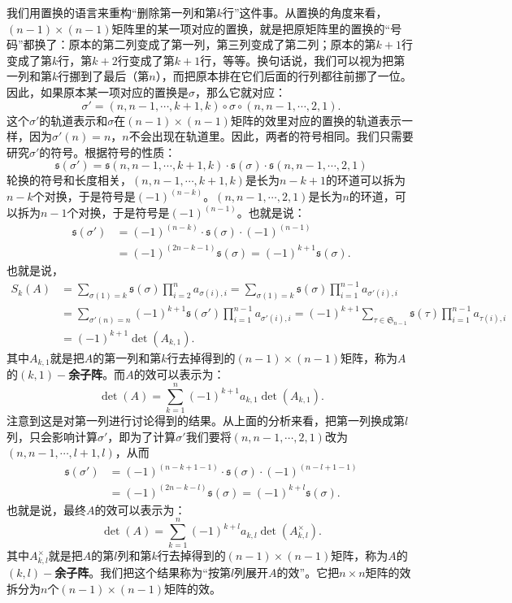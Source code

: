 \documentclass[12pt,UTF8]{ctexbook}
\begin{document}
我们用置换的语言来重构“删除第一列和第$k$行”这件事。从置换的角度来看，$(n-1)\times (n-1)$矩阵里的某一项对应的置换，就是把原矩阵里的置换的“号码”都换了：原本的第二列变成了第一列，第三列变成了第二列；原本的第$k+1$行变成了第$k$行，第$k+2$行变成了第$k+1$行，等等。换句话说，我们可以视为把第一列和第$k$行挪到了最后（第$n$），而把原本排在它们后面的行列都往前挪了一位。因此，如果原本某一项对应的置换是$\sigma$，那么它就对应：
$$
\sigma' = (n,n-1,\cdots,k+1,k)\circ\sigma \circ(n,n-1,\cdots, 2,1).
$$
这个$\sigma'$的轨道表示和$\sigma$在$(n-1)\times (n-1)$矩阵的效里对应的置换的轨道表示一样，因为$\sigma'(n)=n$，$n$不会出现在轨道里。因此，两者的符号相同。我们只需要研究$\sigma'$的符号。根据符号的性质：
$$
\mathfrak{s} (\sigma') = \mathfrak{s}(n,n-1,\cdots,k+1,k)\cdot \mathfrak{s}(\sigma)\cdot \mathfrak{s}(n,n-1,\cdots, 2,1)
$$
轮换的符号和长度相关，$(n,n-1,\cdots,k+1,k)$是长为$n-k+1$的环道可以拆为$n-k$个对换，于是符号是$(-1)^{(n-k)}$。$(n,n-1,\cdots,2,1)$是长为$n$的环道，可以拆为$n-1$个对换，于是符号是$(-1)^{(n-1)}$。也就是说：
\begin{align*}
    \mathfrak{s} (\sigma') &= (-1)^{(n-k)}\cdot \mathfrak{s}(\sigma) \cdot (-1)^{(n-1)} \\
    &= (-1)^{(2n-k-1)}\mathfrak{s}(\sigma) = (-1)^{k+1}\mathfrak{s}(\sigma).
\end{align*}
也就是说，
\begin{align*}
    S_k(A) &= \sum_{\sigma(1)=k} \mathfrak{s}(\sigma) \prod_{i=2}^n a_{\sigma(i),i} = \sum_{\sigma(1)=k} \mathfrak{s}(\sigma) \prod_{i=1}^{n-1} a_{\sigma'(i),i} \\
    &= \sum_{\sigma'(n)=n} (-1)^{k+1}\mathfrak{s}(\sigma') \prod_{i=1}^{n-1} a_{\sigma'(i),i} = (-1)^{k+1}\sum_{\tau\in\mathfrak{S}_{n-1}} \mathfrak{s}(\tau) \prod_{i=1}^{n-1} a_{\tau(i),i} \\
    &= (-1)^{k+1} \det(A_{k,1}).
\end{align*}
其中$A_{k,1}$就是把$A$的第一列和第$k$行去掉得到的$(n-1)\times (n-1)$矩阵，称为$A$的$(k,1)-$\textbf{余子阵}。而$A$的效可以表示为：
$$
\det(A) = \sum_{k=1}^n (-1)^{k+1} a_{k,1} \det(A_{k,1}).
$$
注意到这是对第一列进行讨论得到的结果。从上面的分析来看，把第一列换成第$l$列，只会影响计算$\sigma'$，即为了计算$\sigma'$我们要将$(n,n-1,\cdots, 2,1)$改为$(n,n-1,\cdots,l+1,l)$，从而
\begin{align*}
    \mathfrak{s} (\sigma') &= (-1)^{(n-k+1-1)}\cdot \mathfrak{s}(\sigma) \cdot (-1)^{(n-l+1-1)} \\
    &= (-1)^{(2n-k-l)}\mathfrak{s}(\sigma) = (-1)^{k+l}\mathfrak{s}(\sigma).
\end{align*}
也就是说，最终$A$的效可以表示为：
$$
\det(A) = \sum_{k=1}^n (-1)^{k+l} a_{k,l} \det(A_{k,l}^{\times}).
$$
其中$A_{k,l}^{\times}$就是把$A$的第$l$列和第$k$行去掉得到的$(n-1)\times (n-1)$矩阵，称为$A$的$(k,l)-$\textbf{余子阵}。我们把这个结果称为“按第$l$列展开$A$的效”。它把$n\times n$矩阵的效拆分为$n$个$(n-1)\times (n-1)$矩阵的效。
\end{document}
